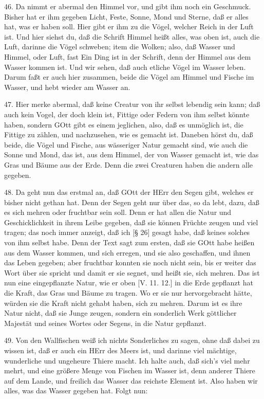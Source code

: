46. Da nimmt er abermal den Himmel vor, und gibt ihm noch ein Geschmuck. Bisher hat er ihm gegeben Licht, Feste, Sonne, Mond und Sterne, daß er alles hat, was er haben soll. Hier gibt er ihm zu die Vögel, welcher Reich in der Luft ist. Und hier siehst du, daß die Schrift Himmel heißt alles, was oben ist, auch die Luft, darinne die Vögel schweben; item die Wolken; also, daß Wasser und Himmel, oder Luft, fast Ein Ding ist in der Schrift, denn der Himmel aus dem Wasser kommen ist. Und wir sehen, daß auch etliche Vögel im Wasser leben. Darum faßt er auch hier zusammen, beide die Vögel am Himmel und Fische im Wasser, und hebt wieder am Wasser an.

47. Hier merke abermal, daß keine Creatur von ihr selbst lebendig sein kann; daß auch kein Vogel, der doch klein ist, Fittige oder Federn von ihm selbst könnte haben, sondern GOtt gibt es einem jeglichen, also, daß es unmöglich ist, die Fittige zu zählen, und nachzusehen, wie es gemacht ist. Daneben hörst du, daß beide, die Vögel und Fische, aus wässeriger Natur gemacht sind, wie auch die Sonne und Mond, das ist, aus dem Himmel, der von Wasser gemacht ist, wie das Gras und Bäume aus der Erde. Denn die zwei Creaturen haben die andern alle gegeben.

48. Da geht nun das erstmal an, daß GOtt der HErr den Segen gibt, welches er bisher nicht gethan hat. Denn der Segen geht nur über das, so da lebt, dazu, daß es sich mehren oder fruchtbar sein soll. Denn er hat allen die Natur und Geschicklichkeit in ihrem Leibe gegeben, daß sie können Früchte zeugen und viel tragen; das noch immer anzeigt, daß ich [§ 26] gesagt habe,
daß keines solches von ihm selbst habe. Denn der Text sagt zum ersten, daß sie GOtt habe heißen aus dem Wasser kommen, und sich erregen, und sie also geschaffen, und ihnen das Leben gegeben; aber fruchtbar konnten sie noch nicht sein, bis er weiter das Wort über sie spricht und damit er sie segnet, und heißt sie, sich mehren. Das ist nun eine eingepflanzte Natur, wie er oben [V. 11. 12.] in die Erde gepflanzt hat die Kraft, das Gras und Bäume zu tragen. Wo er sie nur hervorgebracht hätte, würden sie die Kraft nicht gehabt haben, sich zu mehren. Darum ist es ihre Natur nicht, daß sie Junge zeugen, sondern ein sonderlich Werk göttlicher Majestät und seines Wortes oder Segens, in die Natur gepflanzt.

49. Von den Wallfischen weiß ich nichts Sonderliches zu sagen, ohne daß dabei zu wissen ist, daß er auch ein HErr des Meers ist, und darinne viel mächtige, wunderliche und ungeheure Thiere macht. Ich halte auch, daß sich's viel mehr mehrt, und eine größere Menge von Fischen im Wasser ist, denn anderer Thiere auf dem Lande, und freilich das Wasser das reichste Element ist. Also haben wir alles, was das Wasser gegeben hat. Folgt nun:

